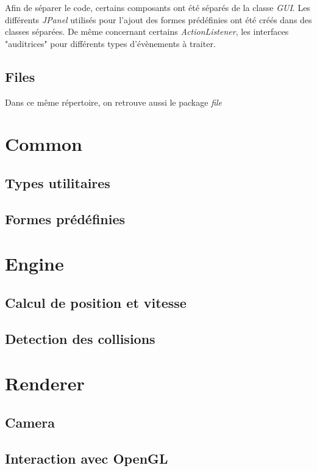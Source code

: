 \documentclass[11pt]{report}
\begin{document}
Afin de séparer le code, certains composants ont été séparés de la classe \textit{GUI}. Les différents \textit{JPanel} utilisés pour l'ajout des formes prédéfinies ont été créés dans des classes séparées. De même concernant certains \textit{ActionListener}, les interfaces "auditrices" pour différents types d'évènements à traiter.


\subsection{Files}
Dans ce même répertoire, on retrouve aussi le package \textit{file}

\section{Common}

\subsection{Types utilitaires}

\subsection{Formes prédéfinies}

\section{Engine}

\subsection{Calcul de position et vitesse}

\subsection{Detection des collisions}

\section{Renderer}

\subsection{Camera}

\subsection{Interaction avec OpenGL}
\end{document}

